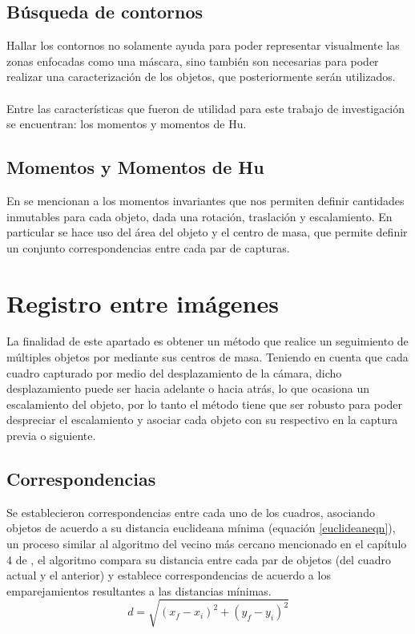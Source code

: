 \subsection{Búsqueda de contornos}
    Hallar los contornos no solamente ayuda para poder representar visualmente las zonas enfocadas como una máscara, sino también son necesarias para poder realizar una caracterización de los objetos, que posteriormente serán utilizados.\\
\\
Entre las características que fueron de utilidad para este trabajo de investigación se encuentran: los momentos y momentos de Hu.
\subsection{Momentos y Momentos de Hu}
    En \citet{Flusser2009} se mencionan a los momentos invariantes que nos permiten definir cantidades inmutables para cada objeto, dada una rotación, traslación y escalamiento. En particular se hace uso del área del objeto y el centro de masa, que permite definir un conjunto correspondencias entre cada par de capturas.

\section{Registro entre imágenes}
La finalidad de este apartado es obtener un método que realice un seguimiento de múltiples objetos por mediante sus centros de masa. Teniendo en cuenta que cada cuadro capturado por medio del desplazamiento de la cámara, dicho desplazamiento puede ser hacia adelante o hacia atrás, lo que ocasiona un escalamiento del objeto, por lo tanto el método tiene que ser robusto para poder despreciar el escalamiento y asociar cada objeto con su respectivo en la captura previa o siguiente. 
\subsection{Correspondencias}
Se establecieron correspondencias entre cada uno de los cuadros, asociando objetos de acuerdo a su distancia euclideana mínima (equación \ref{euclideaneqn}), un proceso similar al algoritmo del vecino más cercano mencionado en el capítulo 4 de \citet{Waltz2008}, el algoritmo compara su distancia entre cada par de objetos (del cuadro actual y el anterior) y establece correspondencias de acuerdo a los emparejamientos resultantes a las distancias mínimas.
\begin{equation}
d = \sqrt{(x_f-x_i)^2 +(y_f - y_i)^2} 
\label{euclideaneqn}
\end{equation}

